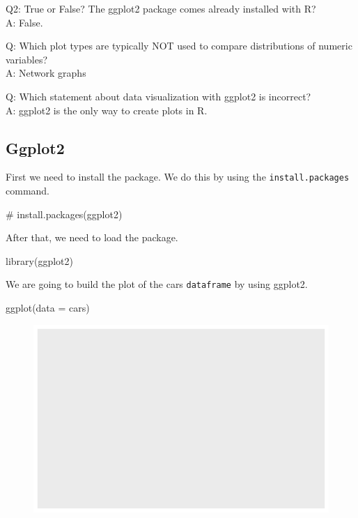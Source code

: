 \documentclass[
  letterpaper,
  DIV=11,
  numbers=noendperiod]{scrartcl}
\newenvironment{Shaded}{\begin{snugshade}}{\end{snugshade}}
\newcommand{\AttributeTok}[1]{\textcolor[rgb]{0.40,0.45,0.13}{#1}}
\newcommand{\CommentTok}[1]{\textcolor[rgb]{0.37,0.37,0.37}{#1}}
\newcommand{\FunctionTok}[1]{\textcolor[rgb]{0.28,0.35,0.67}{#1}}
\newcommand{\NormalTok}[1]{\textcolor[rgb]{0.00,0.23,0.31}{#1}}
\begin{document}
Q2: True or False? The ggplot2 package comes already installed with R?\\
A: False.

Q: Which plot types are typically NOT used to compare distributions of
numeric variables?\\
A: Network graphs

Q: Which statement about data visualization with ggplot2 is incorrect?\\
A: ggplot2 is the only way to create plots in R.

\hypertarget{ggplot2}{%
\subsection{Ggplot2}\label{ggplot2}}

First we need to install the package. We do this by using the
\texttt{install.packages} command.

\begin{Shaded}
\begin{Highlighting}[]
\CommentTok{\# install.packages(\textquotesingle{}ggplot2\textquotesingle{})}
\end{Highlighting}
\end{Shaded}

After that, we need to load the package.

\begin{Shaded}
\begin{Highlighting}[]
\FunctionTok{library}\NormalTok{(ggplot2)}
\end{Highlighting}
\end{Shaded}

We are going to build the plot of the cars \texttt{dataframe} by using
ggplot2.

\begin{Shaded}
\begin{Highlighting}[]
\FunctionTok{ggplot}\NormalTok{(}\AttributeTok{data =}\NormalTok{ cars)}
\end{Highlighting}
\end{Shaded}

\begin{figure}[H]

{\centering \includegraphics{class05_labreport_files/figure-pdf/unnamed-chunk-4-1.pdf}

}

\end{figure}
\end{document}
